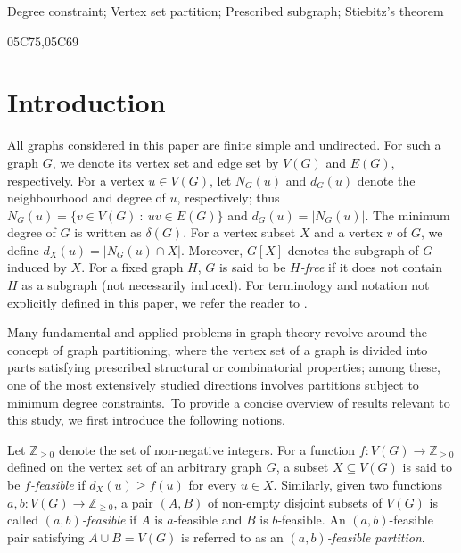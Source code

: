 \documentclass[11p]{elsarticle}
\theoremstyle{definition}
\begin{document}
\begin{frontmatter}
	\begin{keyword}
	Degree constraint; Vertex set partition; Prescribed subgraph; Stiebitz's theorem 
	
	\MSC[2020] 05C75\sep 05C69
\end{keyword}


\end{frontmatter}

\let\thefootnote\relax{}


	 \section{Introduction}
	 
	 
	 All graphs considered in this paper are finite simple and undirected. For such a graph $G$, we denote its vertex set and edge set by $V(G)$ and $E(G)$, respectively. For a vertex $u \in V(G)$, let $N_{G}(u)$ and $d_{G}(u)$ denote the neighbourhood and degree of $u$, respectively; thus $N_{G}(u) = \{ v \in V(G) ~:~ uv \in E(G) \}$ and $d_{G}(u) = |N_{G}(u)|$. The minimum degree of $G$ is written as $\delta(G)$. For a vertex subset $X$ and a vertex $v$ of $G$, we define $d_X(u) = |N_G(u) \cap X|$. Moreover, $G[X]$ denotes the subgraph of $G$ induced by $X$. For a fixed graph $H$, $G$ is said to be \textit{$H$-free} if it does not contain $H$ as a subgraph (not necessarily induced). For terminology and notation not explicitly defined in this paper, we refer the reader to \cite{Diestel}.
	 
	 Many fundamental and applied problems in graph theory revolve around the concept of graph partitioning, where the vertex set of a graph is divided into parts satisfying prescribed structural or combinatorial properties; among these, one of the most extensively studied directions involves partitions subject to minimum degree constraints.~To provide a concise overview of results relevant to this study, we first introduce the following notions.

	 
	Let $\mathbb{Z}_{\ge 0}$ denote the set of non-negative integers. For a function $f \colon V(G) \longrightarrow \mathbb{Z}_{\ge 0}$ defined on the vertex set of an arbitrary graph $G$, a subset $X \subseteq V(G)$ is said to be \emph{$f$-feasible} if $d_X(u) \ge f(u)$ for every $u \in X$. Similarly, given two functions $a,b \colon V(G) \longrightarrow \mathbb{Z}_{\ge 0}$, a pair $(A,B)$ of non-empty disjoint subsets of $V(G)$ is called \emph{$(a,b)$-feasible} if $A$ is $a$-feasible and $B$ is $b$-feasible. An $(a,b)$-feasible pair satisfying $A \cup B = V(G)$ is referred to as an \emph{$(a,b)$-feasible partition}.  
	
\end{document}
